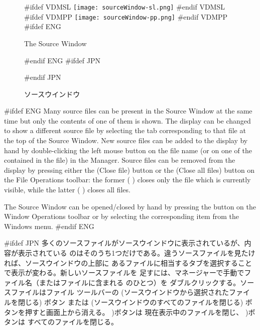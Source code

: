 \documentclass[\pformat,12pt]{article}
\newcommand{\guicmd}[1]{{\sf #1}}
\newcommand{\guicmd}[1]{{\gt #1}}
\begin{document}
\begin{figure}[tbh]
\begin{center}
#ifdef VDMSL
\texttt{[image: sourceWindow-sl.png]}
#endif VDMSL
#ifdef VDMPP
\texttt{[image: sourceWindow-pp.png]}
#endif VDMPP
#ifdef ENG
\caption{The Source Window}
#endif ENG
#ifdef JPN
\caption{ソースウインドウ}
#endif JPN
\label{fig:source2}
\end{center}
\end{figure}

#ifdef ENG
Many source files can be present in the \guicmd{Source Window} at the
same time but only the contents of one of them is shown. The display
can be changed to show a different source file by selecting the tab
corresponding to that file at the top of the \guicmd{Source
  Window}. New source files can be added to the display by hand by
double-clicking the left mouse button on the file name (or on one of
the  contained in the
file) in the \guicmd{Manager}. Source files can be removed from the
display by pressing either the 
(\guicmd{Close file}) button or the 
(\guicmd{Close all files}) button on the \guicmd{File Operations}
toolbar: the former (%
)
closes only the file which is currently visible, while the latter (%
)
closes all files.

The \guicmd{Source Window} can be opened/closed by hand by pressing
the  
button on the \guicmd{Window Operations} toolbar or by
selecting the corresponding item from the \guicmd{Windows} menu.
#endif ENG

#ifdef JPN
多くのソースファイルが\guicmd{ソースウインドウ}に表示されているが、内容が表示されている
のはそのうち1つだけである。違うソースファイルを見たければ、\guicmd{ソースウインドウ}の上部に
あるファイルに相当するタブを選択することで表示が変わる。新しいソースファイルを
足すには、\guicmd{マネージャー}で手動でファイル名（またはファイルに含まれる
 のひとつ）を
ダブルクリックする。ソースファイルは\guicmd{ファイル} ツールバーの 
(\guicmd{ソースウインドウから選択されたファイルを閉じる}) ボタン
または 
(\guicmd{ソースウインドウのすべてのファイルを閉じる}) ボタンを押すと画面上から消える。 
)ボタンは
現在表示中のファイルを閉じ、
)ボタンは
すべてのファイルを閉じる。
\end{document}
